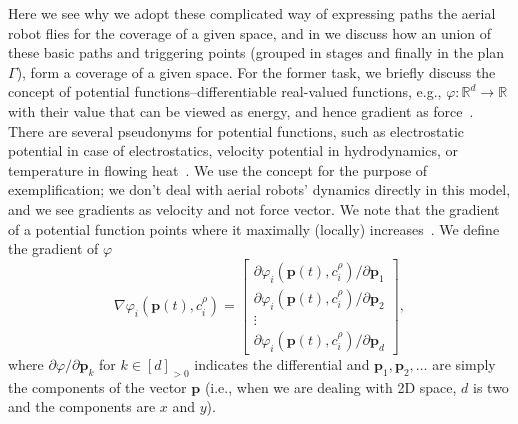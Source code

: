 Here we see why we adopt these complicated way of expressing paths the aerial robot flies for the coverage of a given space, and in  we discuss how an union of these basic paths and triggering points (grouped in stages and finally in the plan $\Gamma$), form a coverage of a given space.
For the former task, we briefly discuss the concept of potential functions--differentiable real-valued functions, e.g., $\varphi:\mathbb{R}^d\rightarrow\mathbb{R}$ with their value that can be viewed as energy, and hence gradient as force~\citep{choset2005principles}. There are several pseudonyms for potential functions, such as electrostatic potential in case of electrostatics, velocity potential in hydrodynamics, or temperature in flowing heat~\citep{needham1998visual}. We use the concept for the purpose of exemplification; we don't deal with aerial robots' dynamics directly in this model, and we see gradients as velocity and not force vector. We note that the gradient of a potential function points where it maximally (locally) increases~\citep{choset2005principles}. We define the gradient of $\varphi$
\begin{equation}\label{eq:grady}
  \nabla\varphi_i(\mathbf{p}(t),c^\rho_i)=\begin{bmatrix}\partial\varphi_i(\mathbf{p}(t),c^\rho_i)/\partial\mathbf{p}_1\\\partial\varphi_i(\mathbf{p}(t),c^\rho_i)/\partial\mathbf{p}_2\\\vdots\\\partial\varphi_i(\mathbf{p}(t),c^\rho_i)/\partial\mathbf{p}_d\end{bmatrix},
\end{equation}
where $\partial\varphi/\partial\mathbf{p}_k$ for $k\in[d]_{>0}$ indicates the differential and $\mathbf{p}_1,\mathbf{p}_2,\dots$ are simply the components of the vector $\mathbf{p}$ (i.e., when we are dealing with 2D space, $d$ is two and the components are $x$ and $y$). 

